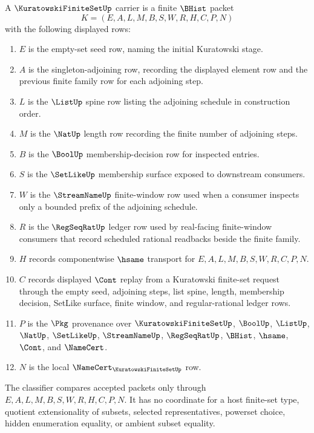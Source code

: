 \begin{definition}
\label{def:kuratowski-finite-set-carrier}
A $\KuratowskiFiniteSetUp$ carrier is a finite $\BHist$ packet
$$
K=(E,A,L,M,B,S,W,R,H,C,P,N)
$$
with the following displayed rows:
\begin{enumerate}
\item $E$ is the empty-set seed row, naming the initial Kuratowski stage.
\item $A$ is the singleton-adjoining row, recording the displayed element row and the previous finite family row for each adjoining step.
\item $L$ is the $\ListUp$ spine row listing the adjoining schedule in construction order.
\item $M$ is the $\NatUp$ length row recording the finite number of adjoining steps.
\item $B$ is the $\BoolUp$ membership-decision row for inspected entries.
\item $S$ is the $\SetLikeUp$ membership surface exposed to downstream consumers.
\item $W$ is the $\StreamNameUp$ finite-window row used when a consumer inspects only a bounded prefix of the adjoining schedule.
\item $R$ is the $\RegSeqRatUp$ ledger row used by real-facing finite-window consumers that record scheduled rational readbacks beside the finite family.
\item $H$ records componentwise $\hsame$ transport for $E,A,L,M,B,S,W,R,C,P,N$.
\item $C$ records displayed $\Cont$ replay from a Kuratowski finite-set request through the empty seed, adjoining steps, list spine, length, membership decision, SetLike surface, finite window, and regular-rational ledger rows.
\item $P$ is the $\Pkg$ provenance over $\KuratowskiFiniteSetUp$, $\BoolUp$, $\ListUp$, $\NatUp$, $\SetLikeUp$, $\StreamNameUp$, $\RegSeqRatUp$, $\BHist$, $\hsame$, $\Cont$, and $\NameCert$.
\item $N$ is the local $\NameCert_{\KuratowskiFiniteSetUp}$ row.
\end{enumerate}
The classifier compares accepted packets only through $E,A,L,M,B,S,W,R,H,C,P,N$. It has no coordinate for a host finite-set type, quotient extensionality of subsets, selected representatives, powerset choice, hidden enumeration equality, or ambient subset equality.
\end{definition}

